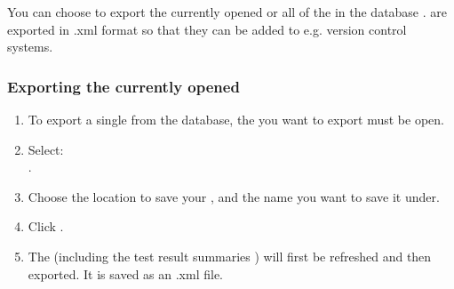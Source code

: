 
 You can choose to export the currently opened \gdproject{}  or all of the \gdprojects{} in the database . \gdprojects{} are exported in .xml format so that they can be added to e.g. version control systems. 


\subsubsection{Exporting the currently opened \gdproject{}}
\label{exportsingle}
\begin{enumerate}
\item To export a single \gdproject{} from the database, the \gdproject{} you want to export must be open.   
\item Select:\\
. 
\item Choose the location to save your \gdproject{}, and the name you want to save it under. 
\item Click . 
\item The \gdproject{} (including the test result summaries ) will first be refreshed and then exported. It is saved as an .xml file. 


\end{enumerate}
